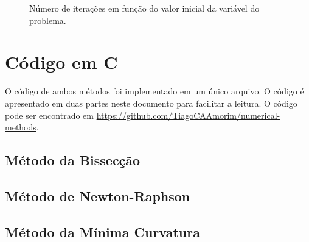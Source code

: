 \documentclass[final,3p,12pt]{elsarticle}
\begin{document}
\begin{figure}[hbt!]
    \label{fig:pontoinicial}
    \centering
    \caption{Número de iterações em função do valor inicial da variável do problema.}
\end{figure}

\newpage
\FloatBarrier
\section{Código em C}

O código de ambos métodos foi implementado em um único arquivo. O código é apresentado em duas partes neste documento para facilitar a leitura. O código pode ser encontrado em \href{https://github.com/TiagoCAAmorim/numerical-methods}{https://github.com/TiagoCAAmorim/numerical-methods}.

\subsection{Método da Bissecção}


\subsection{Método de Newton-Raphson}


\subsection{Método da Mínima Curvatura}

\end{document}
